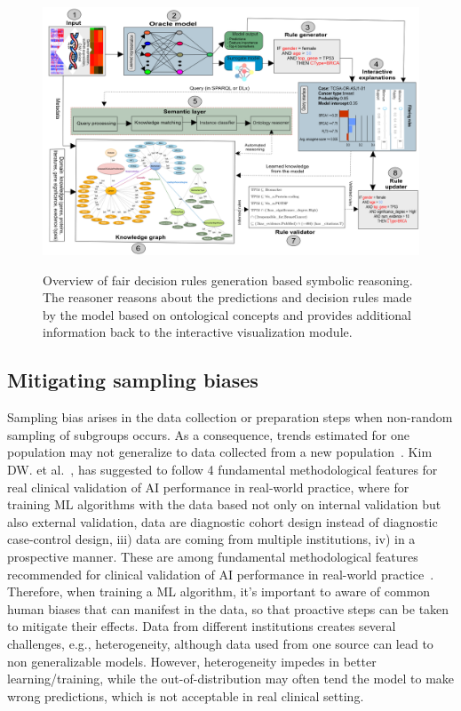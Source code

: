 \begin{figure}
	\centering
	\includegraphics[width=\linewidth]{images/reasoning_wf.png}
    \label{fig:nsreasoning}
	\caption[Overview of fair decision rules generation based symbolic reasoning]{Overview of fair decision rules generation based symbolic reasoning. The reasoner reasons about the predictions and decision rules made by the model based on ontological concepts and provides additional information back to the interactive visualization module.} 
	\vspace{-4mm}
\end{figure}

\subsection{Mitigating sampling biases}
Sampling bias arises in the data collection or preparation steps when non-random sampling of subgroups occurs. As a consequence, trends estimated for one population may not generalize to data collected from a new population~\cite{mehrabi2019survey}. Kim DW. et al.~\cite{kim2019design}, has suggested to follow 4 fundamental methodological features for real clinical validation of AI performance in real-world practice, where for training ML algorithms with the data based not only on internal validation but also external validation, data are diagnostic cohort design instead of diagnostic case-control design, iii) data are coming from multiple institutions, iv) in a prospective manner. These are among fundamental methodological features recommended for clinical validation of AI performance in real-world practice~\cite{kim2019design}. Therefore, when training a ML algorithm, it's important to aware of common human biases that can manifest in the data, so that proactive steps can be taken to mitigate their effects. Data from different institutions creates several challenges, e.g., heterogeneity, although data used from one source can lead to non generalizable models. However, heterogeneity impedes in better learning/training, while the out-of-distribution may often tend the model to make wrong predictions, which is not acceptable in real clinical setting. 

